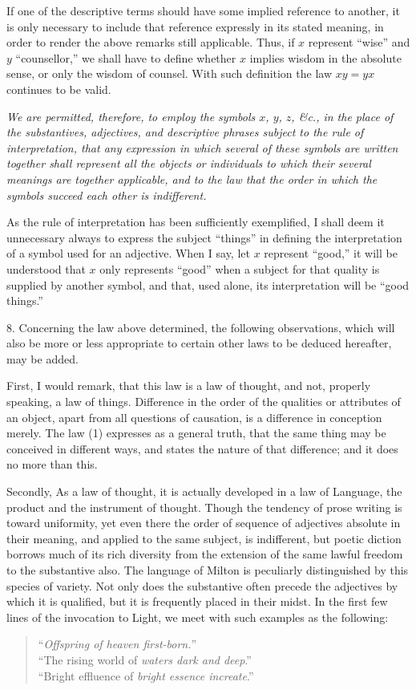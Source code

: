 \documentclass[oneside]{book}
\begin{document}
If one of the descriptive terms should have some implied reference
to another, it is only necessary to include that reference
expressly in its stated meaning, in order to render the above
remarks still applicable. Thus, if $x$ represent ``wise'' and $y$
``counsellor,'' we shall have to define whether $x$ implies wisdom
in the absolute sense, or only the wisdom of counsel. With such
definition the law $xy = yx$ continues to be valid.

\textit{We are permitted, therefore, to employ the symbols $x$, $y$, $z$, \&c., in
the place of the substantives, adjectives, and descriptive phrases subject
to the rule of interpretation, that any expression in which several of
these symbols are written together shall represent all the objects or individuals
to which their several meanings are together applicable, and
to the law that the order in which the symbols succeed each other is
indifferent.}

As the rule of interpretation has been sufficiently exemplified,
I shall deem it unnecessary always to express the subject
``things'' in defining the interpretation of a symbol used for an
adjective. When I say, let $x$ represent ``good,'' it will be understood
that $x$ only represents ``good'' when a subject for that
quality is supplied by another symbol, and that, used alone, its interpretation
will be ``good things.''

8. Concerning the law above determined, the following observations,
which will also be more or less appropriate to certain
other laws to be deduced hereafter, may be added.

First, I would remark, that this law is a law of thought, and
not, properly speaking, a law of things. Difference in the order
of the qualities or attributes of an object, apart from all questions
of causation, is a difference in conception merely. The law
(1) expresses as a general truth, that the same thing may be conceived
in different ways, and states the nature of that difference;
and it does no more than this.

Secondly, As a law of thought, it is actually developed in a
law of Language, the product and the instrument of thought.
Though the tendency of prose writing is toward uniformity,
yet even there the order of sequence of adjectives absolute in
their meaning, and applied to the same subject, is indifferent,
but poetic diction borrows much of its rich diversity from the
extension of the same lawful freedom to the substantive also.
The language of Milton is peculiarly distinguished by this species
of variety. Not only does the substantive often precede the
adjectives by which it is qualified, but it is frequently placed in
their midst. In the first few lines of the invocation to Light,
we meet with such examples as the following:
\begin{verse}
``\textit{Offspring of heaven first-born.}''\\
``The rising world of \textit{waters dark and deep}.''\\
``Bright effluence of \textit{bright essence increate}.''
\end{verse}
\end{document}
